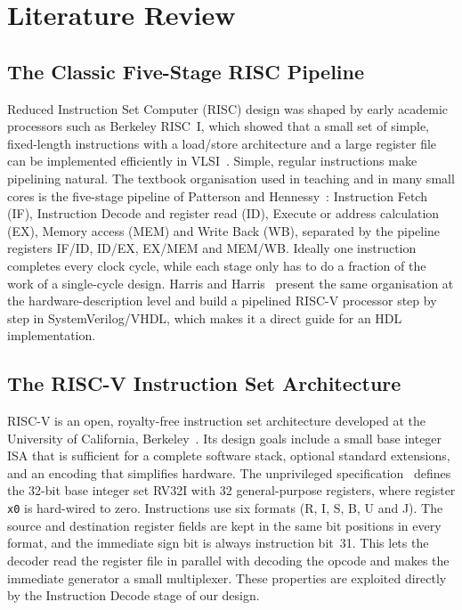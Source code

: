 \section{Literature Review}
\label{sec:literature}

\subsection{The Classic Five-Stage RISC Pipeline}
Reduced Instruction Set Computer (RISC) design was shaped by early academic
processors such as Berkeley RISC~I, which showed that a small set of simple,
fixed-length instructions with a load/store architecture and a large register
file can be implemented efficiently in VLSI~\cite{ym_patterson_risc1}. Simple,
regular instructions make pipelining natural. The textbook organisation used in
teaching and in many small cores is the five-stage pipeline of Patterson and
Hennessy~\cite{ym_patterson_cod_riscv}: Instruction Fetch (IF), Instruction
Decode and register read (ID), Execute or address calculation (EX), Memory
access (MEM) and Write Back (WB), separated by the pipeline registers IF/ID,
ID/EX, EX/MEM and MEM/WB. Ideally one instruction completes every clock cycle,
while each stage only has to do a fraction of the work of a single-cycle
design. Harris and Harris~\cite{ym_harris_ddca_riscv} present the same
organisation at the hardware-description level and build a pipelined RISC-V
processor step by step in SystemVerilog/VHDL, which makes it a direct guide for
an HDL implementation.

\subsection{The RISC-V Instruction Set Architecture}
RISC-V is an open, royalty-free instruction set architecture developed at the
University of California, Berkeley~\cite{ym_waterman_thesis}. Its design goals
include a small base integer ISA that is sufficient for a complete software
stack, optional standard extensions, and an encoding that simplifies hardware.
The unprivileged specification~\cite{ym_riscv_spec} defines the 32-bit base
integer set RV32I with 32 general-purpose registers, where register \texttt{x0}
is hard-wired to zero. Instructions use six formats (R, I, S, B, U and J).
The source and destination register fields are kept in the same bit positions in
every format, and the immediate sign bit is always instruction bit~31. This lets
the decoder read the register file in parallel with decoding the opcode and makes
the immediate generator a small multiplexer. These properties are exploited
directly by the Instruction Decode stage of our design.

